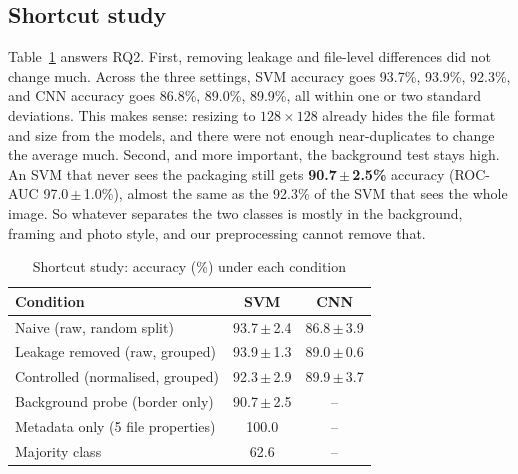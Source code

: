 \documentclass[conference]{IEEEtran}
\newcommand{\pmv}[2]{#1\,$\pm$\,#2}
\begin{document}
\subsection{Shortcut study}
Table~\ref{tab:shortcut} answers RQ2. First, removing leakage and file-level differences did not change much. Across the three settings, SVM accuracy goes 93.7\%, 93.9\%, 92.3\%, and CNN accuracy goes 86.8\%, 89.0\%, 89.9\%, all within one or two standard deviations. This makes sense: resizing to $128\times128$ already hides the file format and size from the models, and there were not enough near-duplicates to change the average much. Second, and more important, the background test stays high. An SVM that never sees the packaging still gets \textbf{\pmv{90.7}{2.5}\%} accuracy (ROC-AUC \pmv{97.0}{1.0}\%), almost the same as the 92.3\% of the SVM that sees the whole image. So whatever separates the two classes is mostly in the background, framing and photo style, and our preprocessing cannot remove that.

\begin{table}[t]
\caption{Shortcut study: accuracy (\%) under each condition}
\label{tab:shortcut}
\centering
\setlength{\tabcolsep}{4pt}
\begin{tabular}{lcc}
\toprule
Condition & SVM & CNN \\
\midrule
Naive (raw, random split) & \pmv{93.7}{2.4} & \pmv{86.8}{3.9} \\
Leakage removed (raw, grouped) & \pmv{93.9}{1.3} & \pmv{89.0}{0.6} \\
Controlled (normalised, grouped) & \pmv{92.3}{2.9} & \pmv{89.9}{3.7} \\
\midrule
Background probe (border only) & \pmv{90.7}{2.5} & -- \\
Metadata only (5 file properties) & 100.0 & -- \\
Majority class & 62.6 & -- \\
\bottomrule
\end{tabular}
\end{table}
\end{document}
